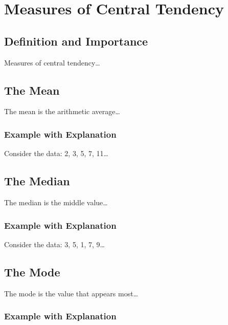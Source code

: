 \documentclass[
  letterpaper,
  DIV=11,
  numbers=noendperiod]{scrreprt}
\begin{document}

\chapter{Measures of Central
Tendency}\label{measures-of-central-tendency}

\section{Definition and Importance}\label{definition-and-importance}

Measures of central tendency\ldots{}

\section{The Mean}\label{the-mean}

The mean is the arithmetic average\ldots{}

\subsection{Example with Explanation}\label{example-with-explanation}

Consider the data: 2, 3, 5, 7, 11\ldots{}

\section{The Median}\label{the-median}

The median is the middle value\ldots{}

\subsection{Example with Explanation}\label{example-with-explanation-1}

Consider the data: 3, 5, 1, 7, 9\ldots{}

\section{The Mode}\label{the-mode}

The mode is the value that appears most\ldots{}

\subsection{Example with Explanation}\label{example-with-explanation-2}
\end{document}
